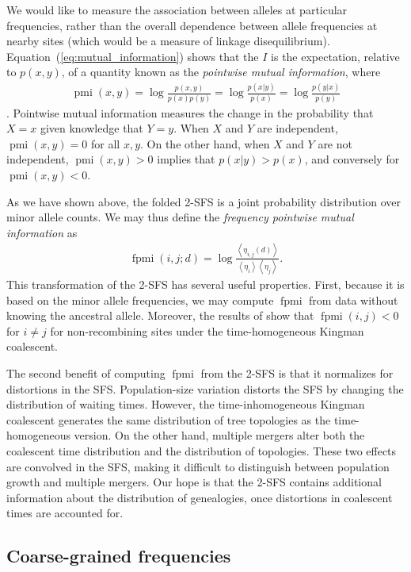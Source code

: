 \documentclass[11pt, letterpaper]{article}   	%
\newcommand{\E}[1]{\left< #1 \right>}
\newcommand{\Eq}[1]{Equation~(\ref{#1})}
\DeclareMathOperator{\pmi}{pmi}
\DeclareMathOperator{\fpmi}{fpmi}
\begin{document}
We would like to measure the association between alleles at particular frequencies, rather than the overall dependence between allele frequencies at nearby sites (which would be a measure of linkage disequilibrium).
\Eq{eq:mutual_information} shows that the $I$ is the expectation, relative to $p(x,y)$, of a quantity known as the \textit{pointwise mutual information}, where
\begin{align}
    \pmi(x,y) = \log \frac{p(x,y)}{p(x)p(y)} = \log \frac{p(x|y)}{p(x)} = \log \frac{p(y|x)}{p(y)}
\end{align}
\autocite{ChurchHanks1990}.
Pointwise mutual information measures the change in the probability that $X=x$ given knowledge that $Y=y$.
When $X$ and $Y$ are independent, $\pmi(x,y) = 0$ for all $x,y$.
On the other hand, when $X$ and $Y$ are not independent, $\pmi(x,y) > 0$ implies that $p(x|y) > p(x)$, and conversely for $\pmi(x,y) < 0$.

As we have shown above, the folded 2-SFS is a joint probability distribution over minor allele counts.
We may thus define the \textit{frequency pointwise mutual information} as
\begin{align}
    \fpmi(i,j;d) = \log \frac{\E{\eta_{i,j}(d)}}{\E{\eta_i} \E{\eta_j}}.
\end{align}
This transformation of the 2-SFS has several useful properties.
First, because it is based on the minor allele frequencies, we may compute $\fpmi$ from data without knowing the ancestral allele.
Moreover, the results of \cite{Fu1995} show that $\fpmi(i,j) < 0$ for $i\neq j$ for non-recombining sites under the time-homogeneous Kingman coalescent.

The second benefit of computing $\fpmi$ from the 2-SFS is that it normalizes for distortions in the SFS.
Population-size variation distorts the SFS by changing the distribution of waiting times.
However, the time-inhomogeneous Kingman coalescent generates the same distribution of tree topologies as the time-homogeneous version.
On the other hand, multiple mergers alter both the coalescent time distribution and the distribution of topologies.
These two effects are convolved in the SFS, making it difficult to distinguish between population growth and multiple mergers.
Our hope is that the 2-SFS contains additional information about the distribution of genealogies, once distortions in coalescent times are accounted for.

\subsection*{Coarse-grained frequencies}
\end{document}
